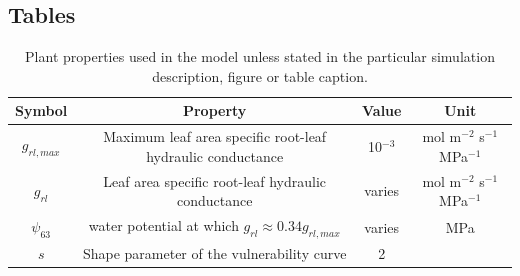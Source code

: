 \documentclass[utf8]{frontiersSCNS} %
\begin{document}
\clearpage


\subsection{Tables}


\begin{table}[h]
    \centering
    \begin{tabular}{c|c|c|c}
        Symbol & Property & Value & Unit \\
        \hline
        $g_{rl,max}$ & Maximum leaf area specific root-leaf hydraulic conductance & 10$^{-3}$ & mol m$^{-2}$ s$^{-1}$ MPa$^{-1}$ \\
        $g_{rl}$ & Leaf area specific root-leaf hydraulic conductance & varies & mol m$^{-2}$ s$^{-1}$ MPa$^{-1}$ \\
        $\psi_{63}$ & water potential at which $g_{rl} \approx 0.34 g_{rl,max}$ & varies & MPa \\
        $s$ & Shape parameter of the vulnerability curve & 2 &  \\
    \end{tabular}
    \caption{Plant properties used in the model unless stated in the particular simulation description, figure or table caption.}
    \label{tab:plant_props}
\end{table}


\end{document}
